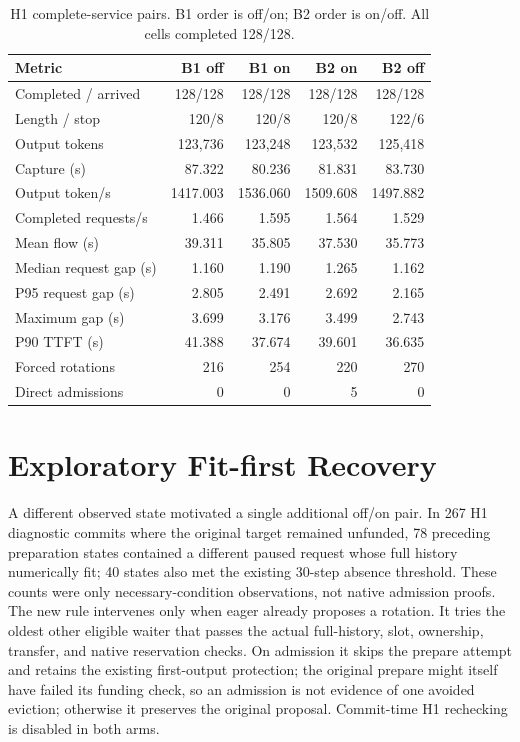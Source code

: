 \documentclass[10pt]{article}
\begin{document}
\begin{table}[t]
\centering\footnotesize
\caption{H1 complete-service pairs. B1 order is off/on; B2 order is on/off. All cells completed 128/128.}
\label{tab:h1}
\begin{tabular}{lrrrr}
\toprule
Metric & B1 off & B1 on & B2 on & B2 off \\
\midrule
Completed / arrived & 128/128 & 128/128 & 128/128 & 128/128 \\
Length / stop & 120/8 & 120/8 & 120/8 & 122/6 \\
Output tokens & 123,736 & 123,248 & 123,532 & 125,418 \\
Capture (s) & 87.322 & 80.236 & 81.831 & 83.730 \\
Output token/s & 1417.003 & 1536.060 & 1509.608 & 1497.882 \\
Completed requests/s & 1.466 & 1.595 & 1.564 & 1.529 \\
Mean flow (s) & 39.311 & 35.805 & 37.530 & 35.773 \\
Median request gap (s) & 1.160 & 1.190 & 1.265 & 1.162 \\
P95 request gap (s) & 2.805 & 2.491 & 2.692 & 2.165 \\
Maximum gap (s) & 3.699 & 3.176 & 3.499 & 2.743 \\
P90 TTFT (s) & 41.388 & 37.674 & 39.601 & 36.635 \\
Forced rotations & 216 & 254 & 220 & 270 \\
Direct admissions & 0 & 0 & 5 & 0 \\
\bottomrule
\end{tabular}
\end{table}

\section{Exploratory Fit-first Recovery}
A different observed state motivated a single additional off/on pair. In 267 H1 diagnostic commits where the original target remained unfunded, 78 preceding preparation states contained a different paused request whose full history numerically fit; 40 states also met the existing 30-step absence threshold. These counts were only necessary-condition observations, not native admission proofs. The new rule intervenes only when eager already proposes a rotation. It tries the oldest other eligible waiter that passes the actual full-history, slot, ownership, transfer, and native reservation checks. On admission it skips the prepare attempt and retains the existing first-output protection; the original prepare might itself have failed its funding check, so an admission is not evidence of one avoided eviction; otherwise it preserves the original proposal. Commit-time H1 rechecking is disabled in both arms.
\end{document}
